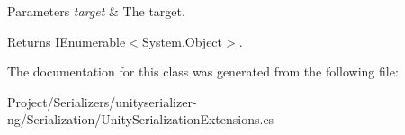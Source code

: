 \begin{DoxyParams}{Parameters}
{\em target} & The target.\\
\hline
\end{DoxyParams}
\begin{DoxyReturn}{Returns}
I\+Enumerable$<$System.\+Object$>$.
\end{DoxyReturn}


The documentation for this class was generated from the following file\+:\begin{DoxyCompactItemize}
\item 
Project/\+Serializers/unityserializer-\/ng/\+Serialization/Unity\+Serialization\+Extensions.\+cs\end{DoxyCompactItemize}
